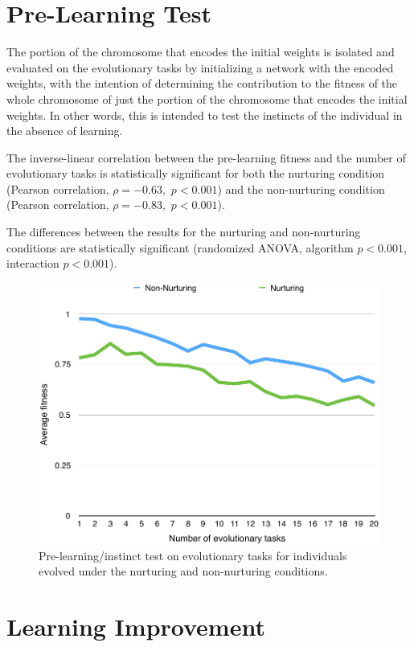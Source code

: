 \documentclass[master]{outhesis}
\begin{document}
\section{Pre-Learning Test}

The portion of the chromosome that encodes the initial weights is isolated and evaluated on the evolutionary tasks by initializing a network with the encoded weights, with the intention of determining the contribution to the fitness of the whole chromosome of just the portion of the chromosome that encodes the initial weights.
In other words, this is intended to test the instincts of the individual in the absence of learning.

The inverse-linear correlation between the pre-learning fitness and the number of evolutionary tasks is statistically significant for both 
the nurturing condition (Pearson correlation, $\rho=-0.63,$ $p < 0.001$)
and the non-nurturing condition (Pearson correlation, $\rho=-0.83,$ $p < 0.001$).

The differences between the results for the nurturing and non-nurturing conditions are statistically significant (randomized ANOVA, algorithm $p < 0.001$, interaction $p < 0.001$).

\begin{figure}[H]
	\centering
	\includegraphics{NetworkTestPlot.pdf}
	\caption{Pre-learning/instinct test on evolutionary tasks for individuals evolved under the nurturing and non-nurturing conditions.}
\end{figure}

\section{Learning Improvement}
\end{document}
